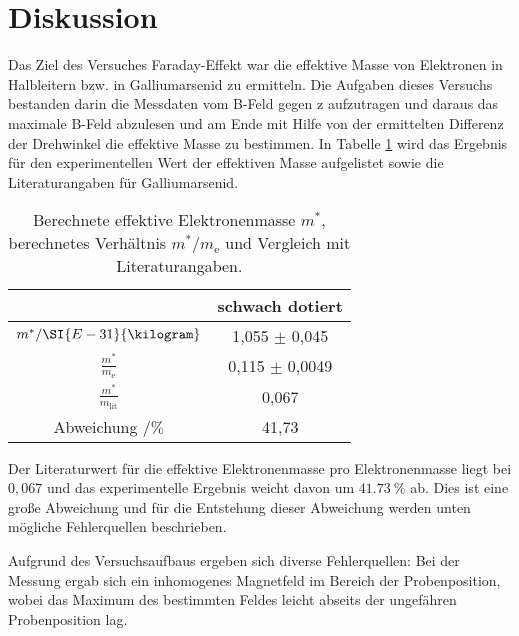 \section{Diskussion}
\label{sec:Diskussion}
Das Ziel des Versuches Faraday-Effekt war die effektive Masse von Elektronen in Halbleitern bzw. in Galliumarsenid zu ermitteln. Die Aufgaben dieses Versuchs bestanden darin die Messdaten vom B-Feld gegen z aufzutragen und daraus das maximale B-Feld abzulesen und am Ende mit Hilfe von der ermittelten Differenz der Drehwinkel die effektive Masse zu bestimmen. In Tabelle \ref{tab:diskussion} wird das Ergebnis für den experimentellen Wert der effektiven Masse aufgelistet sowie die Literaturangaben für Galliumarsenid\cite{EffectiveMass}. 

\begin{table}[htpb]
	\centering
	\caption{Berechnete effektive Elektronenmasse $m^*$, berechnetes Verhältnis $m^*/m_{\text{e}}$ und Vergleich mit Literaturangaben\cite{EffectiveMass}.}
	\label{tab:diskussion}
	\begin{tabular}{cc}
		\toprule
		& schwach dotiert \\
		\midrule
	    $m^* / \SI{E-31}{\kilogram}$ & 1,055 $\pm$ 0,045\\
	    $\frac{m^*}{m_\text{e}}$ &  0,115 $\pm$ 0,0049\\
	    $\frac{m^*}{m_\text{lit}}$ & 0,067 \\
	    Abweichung $/ \si{\percent}$ &  41,73 \\
		\bottomrule
	\end{tabular}
\end{table}

Der Literaturwert für die effektive Elektronenmasse pro Elektronenmasse liegt bei $0,067$ und das experimentelle Ergebnis weicht davon um $\SI{41,73}{\percent}$ ab. Dies ist eine große Abweichung und für die Entstehung dieser Abweichung werden unten mögliche Fehlerquellen beschrieben.

Aufgrund des Versuchsaufbaus ergeben sich diverse Fehlerquellen: 
Bei der Messung ergab sich ein inhomogenes Magnetfeld im Bereich der Probenposition, wobei das Maximum des bestimmten Feldes leicht abseits der ungefähren Probenposition lag.

